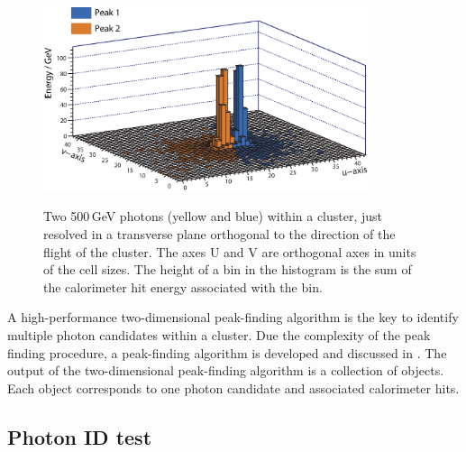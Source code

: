 
\begin{figure}[tbph]
\centering
{\includegraphics[width=0.85\textwidth]{photon/peakFindingMod}}
\caption[Example of projecting a large photon cluster containing two photons.]
{Two 500\,GeV photons (yellow and blue) within a  cluster, just resolved in a transverse plane orthogonal to the direction of the flight of the cluster.  The axes U and V are orthogonal axes in units of the \ECAL cell sizes. The height of a bin in the histogram is the sum of the calorimeter hit energy associated with the bin.}
\label{fig:photonPeakFinding}
\end{figure}


A high-performance two-dimensional peak-finding algorithm is the key to identify multiple photon candidates within a cluster. Due the complexity of the peak finding procedure, a peak-finding algorithm is developed and discussed in . The output of the two-dimensional peak-finding algorithm is a collection of \ShowerPeak objects. Each \ShowerPeak object corresponds to one photon candidate and associated calorimeter hits.

\subsection{Photon ID test}
\label{sec:photonIDtest}

